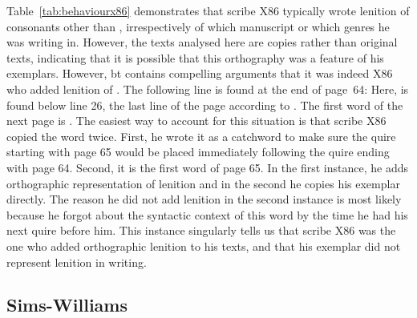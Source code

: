 Table~\ref{tab:behaviourx86} demonstrates that scribe X86 typically wrote lenition of consonants other than , irrespectively of which manuscript or which genres he was writing in. However, the texts analysed here are copies rather than original texts, indicating that it is possible that this orthography was a feature of his exemplars. However, \acrshort{bt} contains compelling arguments that it was indeed X86 who added lenition of . The following line is found at the end of page~64:
Here,  is found below line 26, the last line of the page according to \textcite{evans_facsimile_1915}. The first word of the next page is .
The easiest way to account for this situation is that scribe X86  copied the word  twice. First, he wrote it as a catchword to make sure the quire starting with page 65 would be placed immediately following the quire ending with page 64. Second, it  is the first word of page 65. In the first instance, he adds orthographic representation of lenition and in the second he copies his exemplar directly. The reason he did not add lenition in the second instance is most likely because he forgot about the syntactic context of this word by the time he had his next quire before him. This instance singularly tells us that scribe X86 was the one who added orthographic lenition to his texts, and that his exemplar did not represent lenition in writing.


\subsection{Sims-Williams}
\label{sec:sims-williams}

